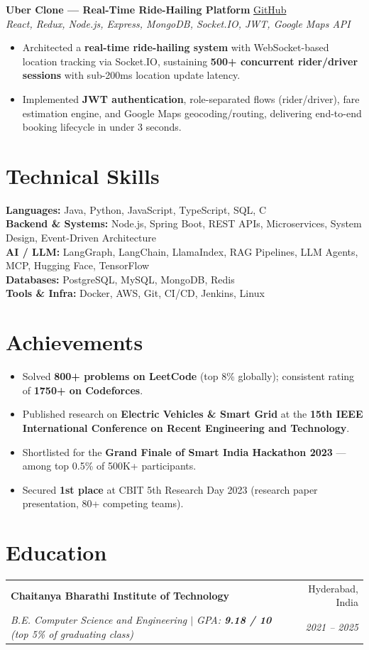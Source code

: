 \documentclass[a4paper,20pt]{article}
\makeatletter
\newcommand{\resumeSubheading}[4]{
\begin{tabular*}{0.97\textwidth}{l@{\extracolsep{\fill}}r}
\textbf{#1} & #2 \\
\textit{#3} & \textit{#4} \\
\end{tabular*}\vspace{-6pt}
}
\newcommand{\resumeItem}[1]{
\item\small{#1}
}
\makeatother
\begin{document}
\vspace{2pt}

\textbf{Uber Clone — Real-Time Ride-Hailing Platform}
\hfill \href{https://github.com/BoorlaKarthikeya/UberClone_MERN}{GitHub} \\
\textit{React, Redux, Node.js, Express, MongoDB, Socket.IO, JWT, Google Maps API}
\begin{itemize}[leftmargin=*, itemsep=-2pt]
\resumeItem{Architected a \textbf{real-time ride-hailing system} with WebSocket-based location tracking via Socket.IO, sustaining \textbf{500+ concurrent rider/driver sessions} with sub-200ms location update latency.}
\resumeItem{Implemented \textbf{JWT authentication}, role-separated flows (rider/driver), fare estimation engine, and Google Maps geocoding/routing, delivering end-to-end booking lifecycle in under 3 seconds.}
\end{itemize}


\section{Technical Skills}

\textbf{Languages:} Java, Python, JavaScript, TypeScript, SQL, C \\
\textbf{Backend \& Systems:} Node.js, Spring Boot, REST APIs, Microservices, System Design, Event-Driven Architecture \\
\textbf{AI / LLM:} LangGraph, LangChain, LlamaIndex, RAG Pipelines, LLM Agents, MCP, Hugging Face, TensorFlow \\
\textbf{Databases:} PostgreSQL, MySQL, MongoDB, Redis \\
\textbf{Tools \& Infra:} Docker, AWS, Git, CI/CD, Jenkins, Linux \\


\section{Achievements}

\begin{itemize}[leftmargin=*, itemsep=-2pt]
\resumeItem{Solved \textbf{800+ problems on LeetCode} (top 8\% globally); consistent rating of \textbf{1750+ on Codeforces}.}
\resumeItem{Published research on \textbf{Electric Vehicles \& Smart Grid} at the \textbf{15th IEEE International Conference on Recent Engineering and Technology}.}
\resumeItem{Shortlisted for the \textbf{Grand Finale of Smart India Hackathon 2023} — among top 0.5\% of 500K+ participants.}
\resumeItem{Secured \textbf{1st place} at CBIT 5th Research Day 2023 (research paper presentation, 80+ competing teams).}
\end{itemize}


\section{Education}

\resumeSubheading
{Chaitanya Bharathi Institute of Technology}{Hyderabad, India}
{B.E. Computer Science and Engineering $|$ GPA: \textbf{9.18 / 10} (top 5\% of graduating class)}{2021 -- 2025}
\end{document}
